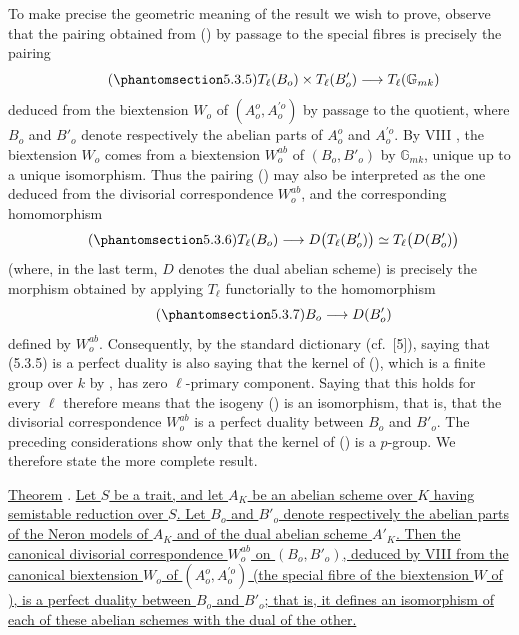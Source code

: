 To make precise the geometric meaning of the result we wish to prove,
observe that the pairing obtained from () by passage to the
special fibres is precisely the pairing
\begin{equation}\tag{\SGARefTarget{sga7.sga7i.eix.n5-3-5}{5.3.5}}
 T_\ell(B_o)\times T_\ell(B'_o)
 \longrightarrow T_\ell(\mathbb G_{mk})
\end{equation}
deduced from the biextension $W_o$ of
$(A_o^o,A_o^{\prime o})$ by passage to the quotient, where
$B_o$ and $B'_o$ denote respectively the abelian parts of
$A_o^o$ and $A_o^{\prime o}$.  By VIII , the biextension
$W_o$ comes from a biextension $W_o^{ab}$ of
$(B_o,B'_o)$ by $\mathbb G_{mk}$, unique up to a unique
isomorphism.  Thus the pairing () may also be interpreted as the
one deduced from the divisorial correspondence $W_o^{ab}$, and the
corresponding homomorphism
\begin{equation}\tag{\SGARefTarget{sga7.sga7i.eix.n5-3-6}{5.3.6}}
 T_\ell(B_o)
 \longrightarrow D\bigl(T_\ell(B'_o)\bigr)
 \simeq T_\ell\bigl(D(B'_o)\bigr)
\end{equation}
(where, in the last term, $D$ denotes the dual abelian scheme) is
precisely the morphism obtained by applying $T_\ell$ functorially to
the homomorphism
\begin{equation}\tag{\SGARefTarget{sga7.sga7i.eix.n5-3-7}{5.3.7}}
 B_o\longrightarrow D(B'_o)
\end{equation}
defined by $W_o^{ab}$.  Consequently, by the standard dictionary
(cf.\ [5]), saying that (5.3.5) is a perfect duality is also saying that
the kernel of (), which is a finite group over $k$ by , has
zero $\ell$-primary component.  Saying that this holds for every
$\ell$ therefore means that the isogeny () is an isomorphism,
that is, that the divisorial correspondence $W_o^{ab}$ is a perfect
duality between $B_o$ and $B'_o$.  The preceding considerations
show only that the kernel of () is a $p$-group.  We therefore
state the more complete result.

\medskip
\noindent
\underline{Theorem} . \underline{Let $S$ be a trait, and let
$A_K$ be an abelian scheme over $K$ having semistable reduction
over $S$.  Let $B_o$ and $B'_o$ denote respectively the
abelian parts of the Neron models of $A_K$ and of the dual abelian
scheme $A'_K$.  Then the canonical divisorial correspondence
$W_o^{ab}$ on $(B_o,B'_o)$, deduced by VIII  from the
canonical biextension $W_o$ of $(A_o^o,A_o^{\prime o})$ (the
special fibre of the biextension $W$ of ), is a perfect duality
between $B_o$ and $B'_o$; that is, it defines an isomorphism
of each of these abelian schemes with the dual of the other.}

